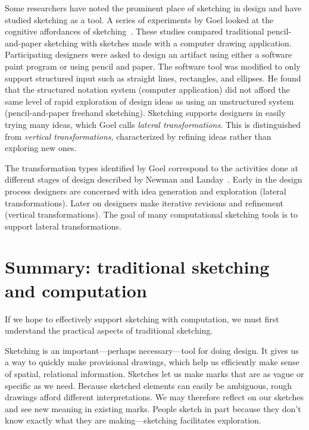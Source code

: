 Some researchers have noted the prominent place of sketching in design
and have studied sketching as a tool. A series of experiments by Goel
looked at the cognitive affordances of
sketching~\cite{goel-sketches-of-thought}. These studies compared
traditional pencil-and-paper sketching with sketches made with a
computer drawing application. Participating designers were asked to
design an artifact using either a software paint program or using
pencil and paper. The software tool was modified to only support
structured input such as straight lines, rectangles, and ellipses. He
found that the structured notation system (computer application) did
not afford the same level of rapid exploration of design ideas as
using an unstructured system (pencil-and-paper freehand
sketching). Sketching supports designers in easily trying many ideas,
which Goel calls \textit{lateral transformations}. This is
distinguished from \textit{vertical transformations}, characterized by
refining ideas rather than exploring new ones.

The transformation types identified by Goel correspond to the
activities done at different stages of design described by Newman and
Landay~\cite{newman-web-designers}. Early in the design process
designers are concerned with idea generation and exploration (lateral
transformations). Later on designers make iterative revisions and
refinement (vertical transformations). The goal of many computational
sketching tools is to support lateral transformations.


\section{Summary: traditional sketching and computation}
\label{ref:traditional-summary}

If we hope to effectively support sketching with computation, we must
first understand the practical aspects of traditional sketching. 

Sketching is an important---perhaps necessary---tool for doing
design. It gives us a way to quickly make provisional drawings, which
help us efficiently make sense of spatial, relational
information. Sketches let us make marks that are as vague or specific
as we need. Because sketched elements can easily be ambiguous, rough
drawings afford different interpretations. We may therefore reflect on
our sketches and see new meaning in existing marks. People sketch in
part because they don't know exactly what they are making---sketching
facilitates exploration.

